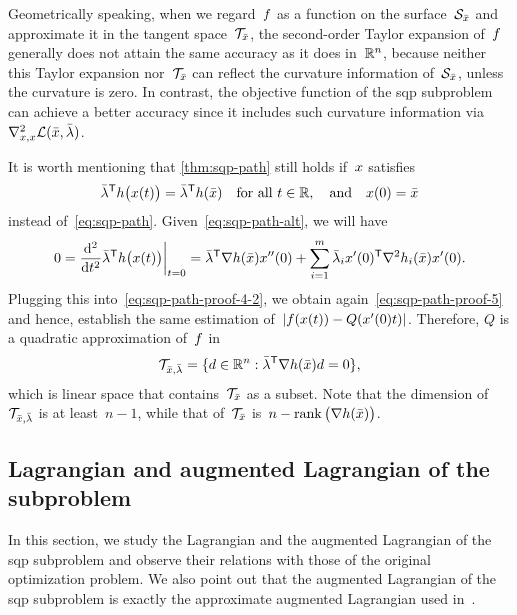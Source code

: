 Geometrically speaking, when we regard~$f$ as a function on the surface~$\mathcal{S}_{\bar{\iter}}$ and approximate it in the tangent space~$\mathcal{T}_{\bar{\iter}}$, the second-order Taylor expansion of~$f$ generally does not attain the same accuracy as it does in~$\mathbb{R}^n$, because neither this Taylor expansion nor~$\mathcal{T}_{\bar{\iter}}$ can reflect the curvature information
of~$\mathcal{S}_{\bar{\iter}}$, unless the curvature is zero.
In contrast, the objective function of the \gls{sqp} subproblem can achieve a better accuracy since it includes such curvature information via~$\nabla_{x, x}^2 \lag(\bar{\iter}, \bar{\lm})$.

It is worth mentioning that \cref{thm:sqp-path} still holds if~$\iter$ satisfies
\begin{equation}
    \label{eq:sqp-path-alt}
    \bar{\lm}^{\T} h \big( \iter(t) \big) = \bar{\lm}^{\T} h(\bar{\iter}) \quad \text{for all~$t \in \R$}, \quad \text{and} \quad \iter(0) = \bar{\iter}
\end{equation}
instead of~\cref{eq:sqp-path}.
Given~\cref{eq:sqp-path-alt}, we will have
\begin{equation*}
    0 = \frac{\du^2}{\du t^2} \bar{\lm}^{\T} h \big( \iter(t) \big) \bigg\vert_{t = 0} = \bar{\lm}^{\T} \nabla h(\bar{\iter}) \iter''(0) + \sum_{i = 1}^m \bar{\lm}_i \iter'(0)^{\T} \nabla^2 h_i(\bar{\iter}) \iter'(0).
\end{equation*}
Plugging this into~\cref{eq:sqp-path-proof-4-2}, we obtain again~\cref{eq:sqp-path-proof-5} and hence, establish the same estimation of~$\abs{\obj(\iter(t)) - Q(x'(0) t)}$.
Therefore, $Q$ is a quadratic approximation of~$f$ in
\begin{equation*}
    \mathcal{T}_{\bar{\iter}, \bar{\lm}} = \set{\step \in \R^n : \bar{\lm}^{\T} \nabla h(\bar{\iter}) \step = 0},
\end{equation*}
which is linear space that contains~$\mathcal{T}_{\bar{\iter}}$ as a subset.
Note that the dimension of~$\mathcal{T}_{\bar{\iter}, \bar{\lm}}$ is at least~$n - 1$, while that of~$\mathcal{T}_{\bar{\iter}}$ is~$n - \rank \big( \nabla h(\bar{\iter}) \big)$.

\subsection{Lagrangian and augmented Lagrangian of the  subproblem}
\label{subsec:lagrangian-augmented-lagrangian}

In this section, we study the Lagrangian and the augmented Lagrangian of the \gls{sqp} subproblem and observe their relations with those of the original optimization problem.
We also point out that the augmented Lagrangian of the \gls{sqp} subproblem is exactly the approximate augmented Lagrangian used in~\cite{Niu_Yuan_2010,Wang_Yuan_2014}.


